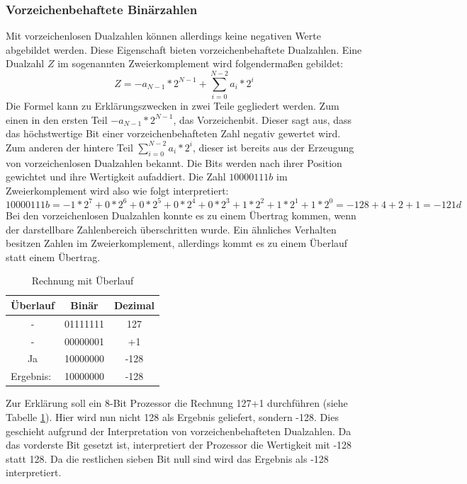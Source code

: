 \documentclass[a4paper,12pt]{article}
\begin{document}
\subsubsection{Vorzeichenbehaftete Binärzahlen}
\noindent Mit vorzeichenlosen Dualzahlen können allerdings keine negativen Werte abgebildet werden. Diese Eigenschaft bieten vorzeichenbehaftete Dualzahlen. Eine Dualzahl $Z$ im sogenannten Zweierkomplement wird folgendermaßen gebildet:
$$Z=-a_{N-1}*2^{N-1}+\sum\limits_{i=0}^{N-2} a_i * 2^i$$
Die Formel kann zu Erklärungszwecken in zwei Teile gegliedert werden. Zum einen in den ersten Teil $-a_{N-1}*2^{N-1}$, das Vorzeichenbit. Dieser sagt aus, dass das höchstwertige Bit einer vorzeichenbehafteten Zahl negativ gewertet wird. Zum anderen der hintere Teil $\sum\limits_{i=0}^{N-2} a_i * 2^i$, dieser ist bereits aus der Erzeugung von vorzeichenlosen Dualzahlen bekannt. Die Bits werden nach ihrer Position gewichtet und ihre Wertigkeit aufaddiert. Die Zahl $10000111b$ im Zweierkomplement wird also wie folgt interpretiert:
$$10000111b = -1*2^7+0*2^6+0*2^5+0*2^4+0*2^3+1*2^2+1*2^1+1*2^0 = -128+4+2+1 = -121d$$
Bei den vorzeichenlosen Dualzahlen konnte es zu einem Übertrag kommen, wenn der darstellbare Zahlenbereich überschritten wurde. Ein ähnliches Verhalten besitzen Zahlen im Zweierkomplement, allerdings kommt es zu einem Überlauf statt einem Übertrag. 


\begin{table}[!htb]
\centering
\begin{tabular}{|c|c|c|}
\hline
\textbf{Überlauf}               & \multicolumn{1}{c|}{\textbf{Binär}} & \multicolumn{1}{c|}{\textbf{Dezimal}} \\ \hline
-                               & 01111111                            & 127                                   \\ \hline
-                               & 00000001                            & +1                                    \\ \hline
Ja                              & 10000000                            & -128                                  \\ \hline\hline
\multicolumn{1}{|l|}{Ergebnis:} & 10000000                            & -128                                  \\ \hline
\end{tabular}
\caption{Rechnung mit Überlauf}
\label{tab:ueberlauf}
\end{table}
\newpage
\noindent Zur Erklärung soll ein 8-Bit Prozessor die Rechnung 127+1 durchführen (siehe Tabelle \ref{tab:ueberlauf}). Hier wird nun nicht 128 als Ergebnis geliefert, sondern -128. Dies geschieht aufgrund der Interpretation von vorzeichenbehafteten Dualzahlen. Da das vorderste Bit  gesetzt ist, interpretiert der Prozessor die Wertigkeit mit -128 statt 128. Da die restlichen sieben Bit null sind wird das Ergebnis als -128 interpretiert.
\newpage
\end{document}
